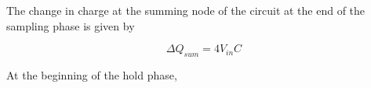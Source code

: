 \documentclass{article}
\begin{document}
The change in charge at the summing node of the circuit at the end of the sampling phase is given by

\begin{equation}
\Delta Q_{sum} = 4V_{in}C
\end{equation}


At the beginning of the hold phase,
\begin{equation}

\end{equation}
\end{document}
